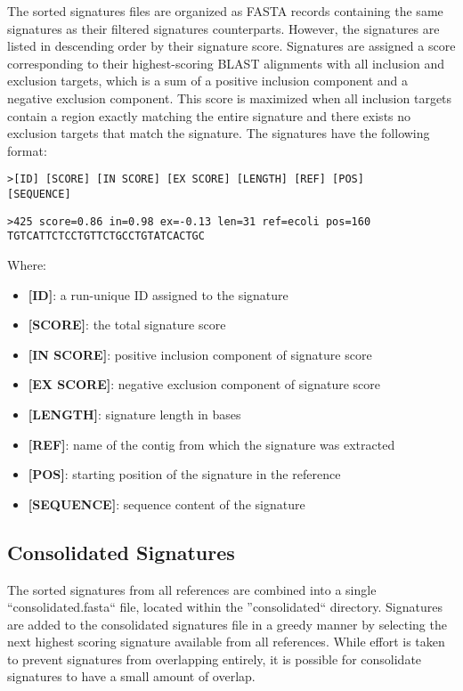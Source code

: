 \documentclass[a4paper,10pt]{article}
\begin{document}
The sorted signatures files are organized as FASTA records containing the same signatures as their filtered signatures counterparts. However, the signatures are listed in descending order by their signature score. Signatures are assigned a score corresponding to their highest-scoring BLAST alignments with all inclusion and exclusion targets, which is a sum of a positive inclusion component and a negative exclusion component. This score is maximized when all inclusion targets contain a region exactly matching the entire signature and there exists no exclusion targets that match the signature. The signatures have the following format:

\begin{verbatim}
>[ID] [SCORE] [IN SCORE] [EX SCORE] [LENGTH] [REF] [POS]
[SEQUENCE]
\end{verbatim}

\begin{verbatim}
>425 score=0.86 in=0.98 ex=-0.13 len=31 ref=ecoli pos=160
TGTCATTCTCCTGTTCTGCCTGTATCACTGC
\end{verbatim}

Where:

\begin{itemize}
  \item \textbf{[ID]}: a run-unique ID assigned to the signature
  \item \textbf{[SCORE]}: the total signature score
  \item \textbf{[IN SCORE]}: positive inclusion component of signature score
  \item \textbf{[EX SCORE]}: negative exclusion component of signature score
  \item \textbf{[LENGTH]}: signature length in bases
  \item \textbf{[REF]}: name of the contig from which the signature was extracted
  \item \textbf{[POS]}: starting position of the signature in the reference
  \item \textbf{[SEQUENCE]}: sequence content of the signature
\end{itemize}

\subsection{Consolidated Signatures}

The sorted signatures from all references are combined into a single ``consolidated.fasta`` file, located within the ''consolidated`` directory. Signatures are added to the consolidated signatures file in a greedy manner by selecting the next highest scoring signature available from all references. While effort is taken to prevent signatures from overlapping entirely, it is possible for consolidate signatures to have a small amount of overlap.
\end{document}
